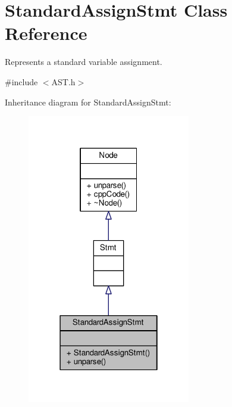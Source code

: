 \hypertarget{classStandardAssignStmt}{\section{Standard\-Assign\-Stmt Class Reference}
\label{classStandardAssignStmt}
}


Represents a standard variable assignment. \par
  




{\ttfamily \#include $<$A\-S\-T.\-h$>$}



Inheritance diagram for Standard\-Assign\-Stmt\-:\nopagebreak
\begin{figure}[H]
\begin{center}
\leavevmode
\includegraphics[width=202pt]{classStandardAssignStmt__inherit__graph}
\end{center}
\end{figure}


